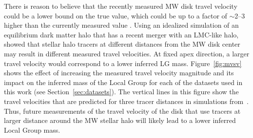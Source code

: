 \documentclass[twocolumn]{aastex631}
\newcommand{\kc}[1]{\textcolor{pink}{\textbf{#1}} }
\newcommand{\mlg}{\ensuremath{M_{\rm LG}}}
\begin{document}

There is reason to believe that the recently measured MW disk travel velocity
could be a lower bound on the true value, which could be up to a factor of
$\sim$2--3 higher than the currently measured value
\cite{Garavito-Camargo2021b}.
Using an idealized simulation of an equilibrium dark matter halo that has a
recent merger with an LMC-like halo, \cite{Garavito-Camargo2021b} showed that
stellar halo tracers at different distances from the MW disk center may result
in different measured travel velocities.
At fixed apex direction, a larger travel velocity would correspond to a lower
inferred LG mass.
Figure~\ref{fig:mvsv} shows the effect of increasing the measured travel
velocity magnitude and its impact on the inferred mass of the Local Group for
each of the datasets used in this work (see Section~\ref{sec:datasets}).
The vertical lines in this figure show the travel velocities that are predicted
for three tracer distances in simulations from~\cite{Garavito-Camargo2021b}.
Thus, future measurements of the travel velocity of the disk that use tracers at
larger distance around the MW stellar halo will likely lead to a lower inferred
Local Group mass.




\end{document}

